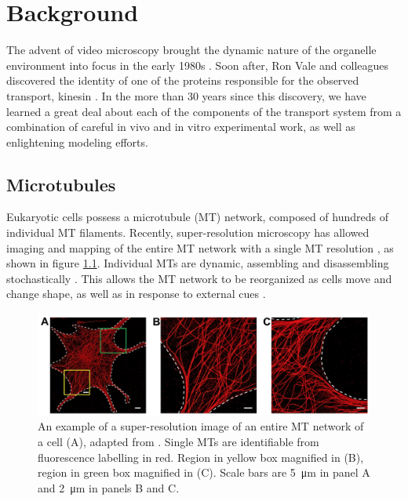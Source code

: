 \chapter{Background} \label{ch:background}

The advent of video microscopy brought the dynamic nature of the organelle environment into focus in the early 1980s \cite{Allen1981,Inoue1981}. Soon after, Ron Vale and colleagues discovered the identity of one of the proteins responsible for the observed transport, kinesin \cite{Vale1985}. In the more than 30 years since this discovery, we have learned a great deal about each of the components of the transport system from a combination of careful in vivo and in vitro experimental work, as well as enlightening modeling efforts.

\section{Microtubules}

Eukaryotic cells possess a microtubule (MT) network, composed of hundreds of individual MT filaments. Recently, super-resolution microscopy has allowed imaging and mapping of the entire MT network with a single MT resolution \cite{Zhang2016}, as shown in figure \ref{fig:MTcytoskeleton}. Individual MTs are dynamic, assembling and disassembling stochastically \cite{Howard2003}. This allows the MT network to be reorganized as cells move and change shape, as well as in response to external cues \cite{Herms2015,Zhu2015,Zhang2016}. 

\begin{figure}
\centering
\includegraphics[scale=.5]{background/MTcytoskeleton}
\caption[Super-resolution image of a MT network]{An example of a super-resolution image of an entire MT network of a cell (A), adapted from \cite{Zhang2016}. Single MTs are identifiable from fluorescence labelling in red. Region in yellow box magnified in (B), region in green box magnified in (C). Scale bars are \SI{5}{\micro\meter} in panel A and \SI{2}{\micro\meter} in panels B and C.}
\label{fig:MTcytoskeleton}
\end{figure}

